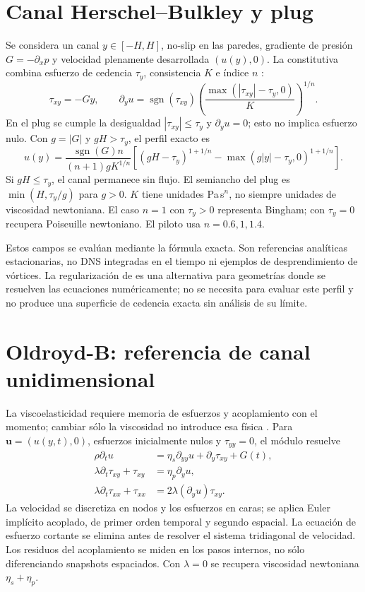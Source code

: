 \documentclass[11pt,oneside,openany]{book}
\begin{document}
\section{Canal Herschel--Bulkley y plug}
Se considera un canal $y\in[-H,H]$, no-slip en las paredes, gradiente de
presión $G=-\partial_xp$ y velocidad plenamente desarrollada $(u(y),0)$.
La constitutiva combina esfuerzo de cedencia $\tau_y$, consistencia $K$
e índice $n$ \citep{herschel1926bulkley}:
\begin{equation}
 \tau_{xy}=-Gy,\qquad
 \partial_yu=\operatorname{sgn}(\tau_{xy})
 \left(\frac{\max(|\tau_{xy}|-\tau_y,0)}{K}\right)^{1/n}.
\end{equation}
En el plug se cumple la desigualdad $|\tau_{xy}|\leq\tau_y$ y
$\partial_yu=0$; esto no implica esfuerzo nulo. Con $g=|G|$ y
$gH>\tau_y$, el perfil exacto es
\begin{equation}
 u(y)=\frac{\operatorname{sgn}(G)n}{(n+1)gK^{1/n}}
 \left[(gH-\tau_y)^{1+1/n}
 -\max(g|y|-\tau_y,0)^{1+1/n}\right].
\end{equation}
Si $gH\leq\tau_y$, el canal permanece sin flujo. El semiancho del
plug es $\min(H,\tau_y/g)$ para $g>0$. $K$ tiene unidades
Pa\,s$^n$, no siempre unidades de viscosidad newtoniana. El caso $n=1$
con $\tau_y>0$ representa Bingham; con $\tau_y=0$ recupera
Poiseuille newtoniano. El piloto usa $n=0.6,1,1.4$.

Estos campos se evalúan mediante la fórmula exacta. Son referencias
analíticas estacionarias, no DNS integradas en el tiempo ni ejemplos de
desprendimiento de vórtices. La regularización de
\citet{papanastasiou1987yield} es una alternativa para geometrías donde se
resuelven las ecuaciones numéricamente; no se necesita para evaluar este
perfil y no produce una superficie de cedencia exacta sin análisis de
su límite.

\section{Oldroyd-B: referencia de canal unidimensional}
La viscoelasticidad requiere memoria de esfuerzos y acoplamiento con el
momento; cambiar sólo la viscosidad no introduce esa física
\citep{oldroyd1950}. Para $\boldsymbol u=(u(y,t),0)$, esfuerzos inicialmente
nulos y $\tau_{yy}=0$, el módulo resuelve
\begin{align}
 \rho\partial_tu&=\eta_s\partial_{yy}u+
                     \partial_y\tau_{xy}+G(t),\\
 \lambda\partial_t\tau_{xy}+\tau_{xy}&=\eta_p\partial_yu,\\
 \lambda\partial_t\tau_{xx}+\tau_{xx}&=
                  2\lambda(\partial_yu)\tau_{xy}.
 \label{eq:oldroyd1d}
\end{align}
La velocidad se discretiza en nodos y los esfuerzos en caras; se aplica
Euler implícito acoplado, de primer orden temporal y segundo espacial.
La ecuación de esfuerzo cortante se elimina antes de resolver el sistema
tridiagonal de velocidad. Los residuos del acoplamiento se miden en los
pasos internos, no sólo diferenciando snapshots espaciados. Con
$\lambda=0$ se recupera viscosidad newtoniana $\eta_s+\eta_p$.
\end{document}
